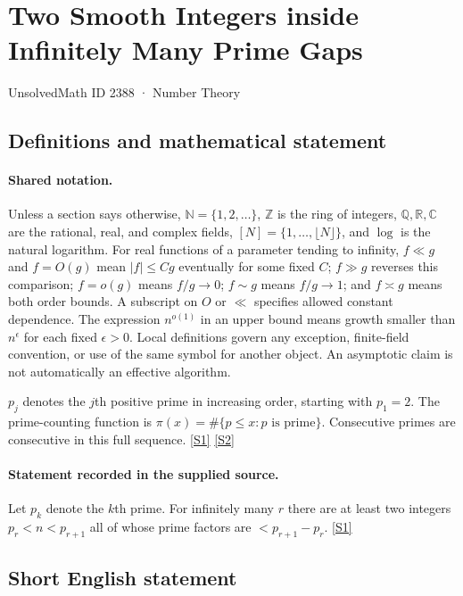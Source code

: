 \documentclass[11pt,a4paper]{article}
\newcommand{\N}{\mathbb{N}}
\newcommand{\Z}{\mathbb{Z}}
\newcommand{\Q}{\mathbb{Q}}
\newcommand{\R}{\mathbb{R}}
\newcommand{\C}{\mathbb{C}}
\newcommand{\sref}[2]{\hyperlink{source:#1:#2}{[S#2]}}
\begin{document}

\setcounter{section}{2387}

\section{Two Smooth Integers inside Infinitely Many Prime Gaps}\label{2388}

{\small\sffamily UnsolvedMath ID 2388 · Number Theory}

\subsection{Definitions and mathematical statement}

\paragraph{Shared notation.}Unless a section says otherwise, $\N=\{1,2,\ldots\}$,
$\Z$ is the ring of integers, $\Q,\R,\C$ are the rational, real, and complex
fields, $[N]=\{1,\ldots,\lfloor N\rfloor\}$, and $\log$ is the natural
logarithm. For real functions of a parameter tending to infinity,
$f\ll g$ and $f=O(g)$ mean $|f|\leq Cg$ eventually for some fixed $C$;
$f\gg g$ reverses this comparison; $f=o(g)$ means $f/g\to0$;
$f\sim g$ means $f/g\to1$; and $f\asymp g$ means both order bounds.
A subscript on $O$ or $\ll$ specifies allowed constant dependence.
The expression $n^{o(1)}$ in an upper bound means growth smaller than
$n^\epsilon$ for each fixed $\epsilon>0$. Local definitions govern any
exception, finite-field convention, or use of the same symbol for another
object. An asymptotic claim is not automatically an effective algorithm.



$p_j$ denotes the $j$th positive prime in increasing order, starting with $p_1=2$. The prime-counting function is $\pi(x)=\#\{p\leq x:p\text{ is prime}\}$. Consecutive primes are consecutive in this full sequence. \sref{2388}{1} \sref{2388}{2}

\paragraph{Statement recorded in the supplied source.}
Let $p_k$ denote the $k$th prime. For infinitely many $r$ there are at least two integers $p_r<n<p_{r+1}$ all of whose prime factors are $<p_{r+1}-p_r$. \sref{2388}{1}

\subsection{Short English statement}
\end{document}
